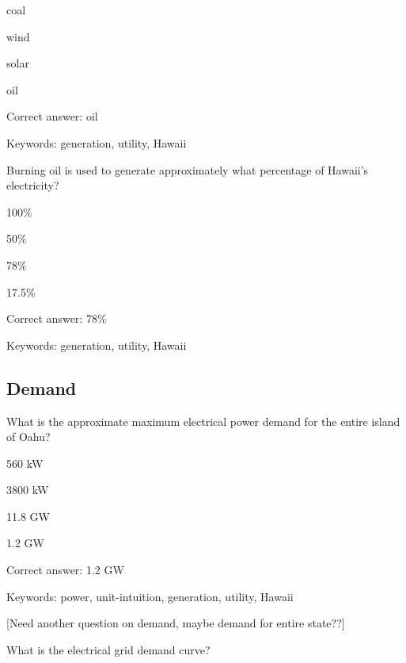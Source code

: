 \begin{answer}
	\item coal
	\item wind
	\item solar
	\item oil
\end{answer}

Correct answer: oil

Keywords: generation, utility, Hawaii

\begin{question}
	\item Burning oil is used to generate approximately what percentage of Hawaii's electricity?
\end{question}

\begin{answer}
	\item 100\%
	\item 50\%
	\item 78\%
	\item 17.5\%
\end{answer}

Correct answer: 78\%

Keywords: generation, utility, Hawaii

\subsection{Demand}

\begin{question}
	\item What is the approximate maximum electrical power demand for the entire island of Oahu?
\end{question}

\begin{answer}
	\item 560 kW
	\item 3800 kW
	\item 11.8 GW
	\item 1.2 GW
\end{answer}

Correct answer: 1.2 GW

Keywords: power, unit-intuition, generation, utility, Hawaii

[Need another question on demand, maybe demand for entire state??]

\begin{question}
	\item What is the electrical grid demand curve?
\end{question}

